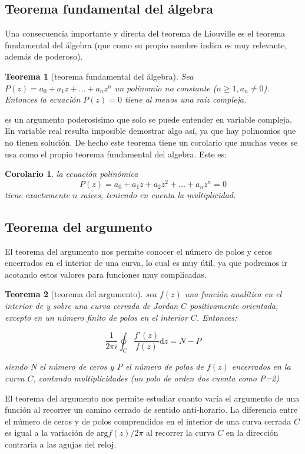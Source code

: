 \documentclass[12pt,a4paper]{book}
\newcommand{\D}{\mathrm{d}}
\newcommand{\Arg}{\mathrm{arg}}
\newtheorem{theorem}{Teorema}[section]
\newtheorem{corollary}{Corolario}[theorem]
\begin{document}
\subsection{Teorema fundamental del álgebra}

Una consecuencia importante y directa del teorema de Liouville es el teorema fundamental del álgebra (que como su propio nombre indica es muy relevante, además de poderoso).

\begin{theorem}[teorema fundamental del álgebra]
Sea $P(z) = a_0+a_1 z+ \ldots+ a_n z^n $ un polinomio no constante ($n \geq 1, a_n \neq 0$). Entonces la ecuación $P(z)=0$ tiene al menos una raíz compleja.
\end{theorem}

es un argumento poderosísimo que solo se puede entender en variable compleja. En variable real resulta imposible demostrar algo así, ya que hay polinomios que  no tienen solución. De hecho este teorema tiene un corolario que muchas veces se usa como el propio teorema fundamental del algebra. Este es:

\begin{corollary}
la ecuación polinómica 
$$ P(z) = a_0 +a_1 z + a_2 z^2 + \ldots + a_n z^n = 0 $$
tiene exactamente $n$ raices, teniendo en cuenta la multiplicidad. 
\end{corollary}


\subsection{Teorema del argumento}

El teorema del argumento nos permite conocer el número de polos y ceros encerrados en el interior de una curva, lo cual es muy útil, ya que podremos ir acotando estos valores para funciones muy complicadas.

\begin{theorem}[teorema del argumento]
sea $f(z)$ una función analítica en el interior de y sobre una curva cerrada de Jordan $C$ positivamente orientada, excepto en un número finito de polos en el interior $C$. Entonces:

$$ \frac{1}{2 \pi i} \oint_C \frac{f'(z)}{f(z)} \D z = N - P $$

siendo N el número de ceros y P el número de polos de $f(z)$ encerrados en la curva $C$, contando multiplicidades (un polo de orden dos cuenta como P=2)
\end{theorem}


El teorema del argumento nos permite estudiar cuanto varía el argumento de una función al recorrer un camino cerrado de sentido anti-horario. La diferencia entre el número de ceros y de polos comprendidos en el interior de una curva cerrada $C$ es igual a la variación de $\Arg f(z) / 2 \pi$ al recorrer la curva $C$ en la dirección contraria a las agujas del reloj. 
\end{document}
